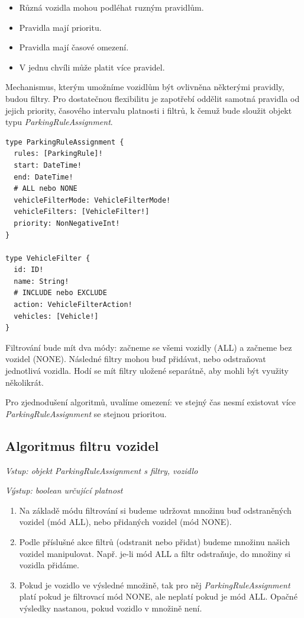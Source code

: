 \begin{itemize}
  \setlength\itemsep{.05em}
  \item Různá vozidla mohou podléhat ruzným pravidlům.
  \item Pravidla mají prioritu.
  \item Pravidla mají časové omezení.
  \item V jednu chvíli může platit více pravidel.
\end{itemize}

\noindent
Mechanismus, kterým umožníme vozidlům být ovlivněna některými pravidly,
budou filtry.
Pro dostatečnou flexibilitu je zapotřebí oddělit samotná pravidla od jejich
priority, časového intervalu platnosti i filtrů,
k čemuž bude sloužit objekt typu \textit{ParkingRuleAssignment}.

\begin{lstlisting}
type ParkingRuleAssignment {
  rules: [ParkingRule]!
  start: DateTime!
  end: DateTime!
  # ALL nebo NONE
  vehicleFilterMode: VehicleFilterMode!
  vehicleFilters: [VehicleFilter!]
  priority: NonNegativeInt!
}

type VehicleFilter {
  id: ID!
  name: String!
  # INCLUDE nebo EXCLUDE
  action: VehicleFilterAction!
  vehicles: [Vehicle!]
}
\end{lstlisting}

Filtrování bude mít dva módy: začneme se všemi vozidly (ALL) a začneme bez vozidel (NONE).
Následné filtry mohou buď přidávat, nebo odstraňovat jednotlivá vozidla.
Hodí se mít filtry uložené separátně, aby mohli být využity několikrát.

Pro zjednodušení algoritmů, uvalíme omezení: ve stejný čas nesmí existovat více \textit{ParkingRuleAssignment}
se stejnou prioritou.

\newpage

\subsection{Algoritmus filtru vozidel}

\noindent
\textit{Vstup: objekt ParkingRuleAssignment s filtry, vozidlo}

\noindent
\textit{Výstup: boolean určující platnost}

\begin{enumerate}
  \setlength\itemsep{.05em}
  \item Na základě módu filtrování si budeme udržovat množinu buď odstraněných vozidel (mód ALL), nebo přidaných vozidel (mód NONE).
  \item Podle příslušné akce filtrů (odstranit nebo přidat) budeme množinu našich vozidel manipulovat. Např. je-li mód ALL a filtr odstraňuje, do množiny si vozidla přidáme.
  \item Pokud je vozidlo ve výsledné množině, tak pro něj \textit{ParkingRuleAssignment} platí pokud je filtrovací mód NONE,
        ale neplatí pokud je mód ALL. Opačné výsledky nastanou, pokud vozidlo v množině není.
\end{enumerate}

